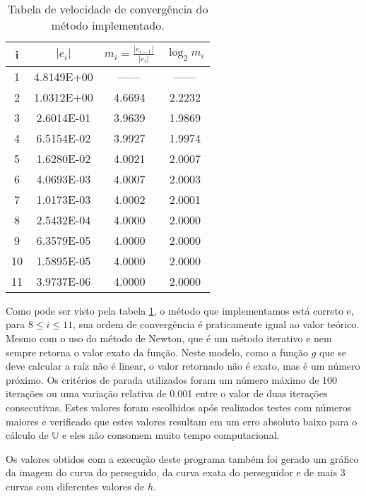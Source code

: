 \documentclass[a4paper,10pt]{article}
\begin{document}
  \begin{table}[ht]
    \begin{center}
      \begin{tabular}{|c || c c c|}
      \hline
      i &  $|e_{i}|$   & $m_{i} = \frac{|e_{i-1}|}{|e_{i}|}$ & $\log_{2}m_{i}$ \\
      \hline
      1 & 4.8149E+00 & ------ & ------ \\
      2 & 1.0312E+00 & 4.6694 & 2.2232 \\ 
      3 & 2.6014E-01 & 3.9639 & 1.9869 \\
      4 & 6.5154E-02 & 3.9927 & 1.9974 \\ 
      5 & 1.6280E-02 & 4.0021 & 2.0007 \\ 
      6 & 4.0693E-03 & 4.0007 & 2.0003 \\ 
      7 & 1.0173E-03 & 4.0002 & 2.0001 \\ 
      8 & 2.5432E-04 & 4.0000 & 2.0000 \\
      9 & 6.3579E-05 & 4.0000 & 2.0000 \\
      10 & 1.5895E-05 & 4.0000 & 2.0000 \\
      11 & 3.9737E-06 & 4.0000 & 2.0000 \\
      \hline
      \end{tabular} 	
    \end{center}
    \label{tab:convergencia}
    \caption{Tabela de velocidade de convergência do método implementado.}
  \end{table}
  
  Como pode ser visto pela tabela \ref{tab:convergencia}, o método que implementamos está correto e, para $8 \leq i \leq 11$, sua ordem de convergência é praticamente igual ao valor teórico. Mesmo com o uso do método de Newton, que é um método iterativo e nem sempre retorna o valor exato da função. Neste modelo, como a função $g$ que se deve calcular a raíz não é linear, o valor retornado não é exato, mas é um número próximo. Os critérios de parada utilizados foram um número máximo de 100 iterações ou uma variação relativa de 0.001 entre o valor de duas iterações consecutivas. Estes valores foram escolhidos após realizados testes com números maiores e verificado que estes valores resultam em um erro absoluto baixo para o cálculo de $\mathbb{U}$ e eles não consomem muito tempo computacional.
  
  Os valores obtidos com a execução deste programa também foi gerado um gráfico da imagem do curva do perseguido, da curva exata do perseguidor e de mais 3 curvas com diferentes valores de $h$.
  
\end{document}
